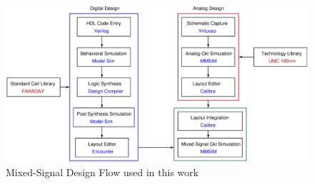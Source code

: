 \begin{figure}[ht]
	\begin{center}
		\includegraphics[scale=0.4]{./Figures/MixedSignalDesignFlow.ps}
		\caption{Mixed-Signal Design Flow used in this work}
		\label{fig:FCC}
	\end{center}
\end{figure}


















